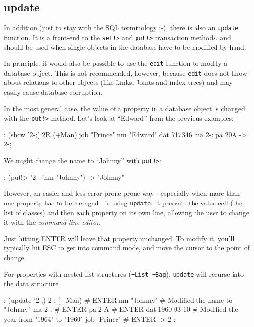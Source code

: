  
\subsection{update}
\label{sec:tut-update}


In addition (just to stay with the SQL terminology ;-), there is also an
\texttt{update} function. It is a front-end to the \texttt{set!>} and \texttt{put!>}
transaction methods, and should be used when single objects in the
database have to be modified by hand.

In principle, it would also be possible to use the \texttt{edit} function to
modify a database object. This is not recommended, however, because
\texttt{edit} does not know about relations to other objects (like Links,
Joints and index trees) and may easily cause database corruption.

In the most general case, the value of a property in a database object
is changed with the \texttt{put!>} method. Let's look at ``Edward'' from the
previous examples:


\begin{wideverbatim}
: (show '{2-;})
{2R} (+Man)
   job "Prince"
   nm "Edward"
   dat 717346
   ma {2-:}
   pa {20A}
-> {2-;}
\end{wideverbatim}

We might change the name to ``Johnny'' with \texttt{put!>}:


\begin{wideverbatim}
: (put!> '{2-;} 'nm "Johnny")
-> "Johnny"
\end{wideverbatim}

However, an easier and less error-prone prone way - especially when more
than one property has to be changed - is using \texttt{update}. It presents the
value cell (the list of classes) and then each property on its own line,
allowing the user to change it with the \emph{command line editor}.

Just hitting ENTER will leave that property unchanged. To modify it,
you'll typically hit ESC to get into command mode, and move the cursor
to the point of change.

For properties with nested list structures (\texttt{+List +Bag}), \texttt{update} will
recurse into the data structure.


\begin{wideverbatim}
: (update '{2-;})
{2-;} (+Man)      # ENTER
nm "Johnny"       # Modified the name to "Johnny"
ma {2-:}          # ENTER
pa {2-A}          # ENTER
dat 1960-03-10    # Modified the year from "1964" to "1960"
job "Prince"      # ENTER
-> {2-;}
\end{wideverbatim}

